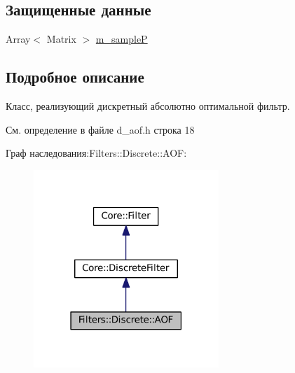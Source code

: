 \subsection*{Защищенные данные}
\begin{DoxyCompactItemize}
\item 
Array$<$ Matrix $>$ \hyperlink{class_filters_1_1_discrete_1_1_a_o_f_aef55ce0cf7129bb7090f8e470bcfbc1f}{m\+\_\+sampleP}
\end{DoxyCompactItemize}


\subsection{Подробное описание}
Класс, реализующий дискретный абсолютно оптимальной фильтр. 

См. определение в файле d\+\_\+aof.\+h строка 18



Граф наследования\+:Filters\+:\+:Discrete\+:\+:A\+OF\+:
\nopagebreak
\begin{figure}[H]
\begin{center}
\leavevmode
\includegraphics[width=198pt]{class_filters_1_1_discrete_1_1_a_o_f__inherit__graph}
\end{center}
\end{figure}


